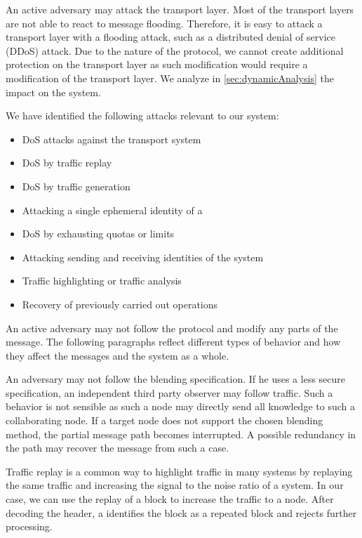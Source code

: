An active adversary may attack the transport layer. Most of the transport layers are not able to react to message flooding. Therefore, it is easy to attack a transport layer with a flooding attack, such as a distributed denial of service (DDoS) attack. Due to the nature of the protocol, we cannot create additional protection on the transport layer as such modification would require a modification of the transport layer. We analyze in \cref{sec:dynamicAnalysis} the impact on the \MessageVortex{} system.

We have identified the following attacks relevant to our system:
\begin{itemize}
	\item DoS attacks against the transport system
	\item DoS by traffic replay
	\item DoS by traffic generation
	\item Attacking a single ephemeral identity of a \VortexNode
	\item DoS by exhausting quotas or limits
	\item Attacking sending and receiving identities of the \MessageVortex{} system
	\item Traffic highlighting or traffic analysis
	\item Recovery of previously carried out operations
\end{itemize}

An active adversary may not follow the protocol and modify any parts of the message. The following paragraphs reflect different types of behavior and how they affect the messages and the system as a whole.

An adversary may not follow the blending specification. If he uses a less secure specification, an independent third party observer may follow traffic. Such a behavior is not sensible as such a node may directly send all knowledge to such a collaborating node. If a target node does not support the chosen blending method, the partial message path becomes interrupted. A possible redundancy in the path may recover the message from such a case.

Traffic replay is a common way to highlight traffic in many systems by replaying the same traffic and increasing the signal to the noise ratio of a system. In our case, we can use the replay of a \VortexMessage block to increase the traffic to a node. After decoding the header, a \VortexNode{} identifies the block as a repeated block and rejects further processing. 


